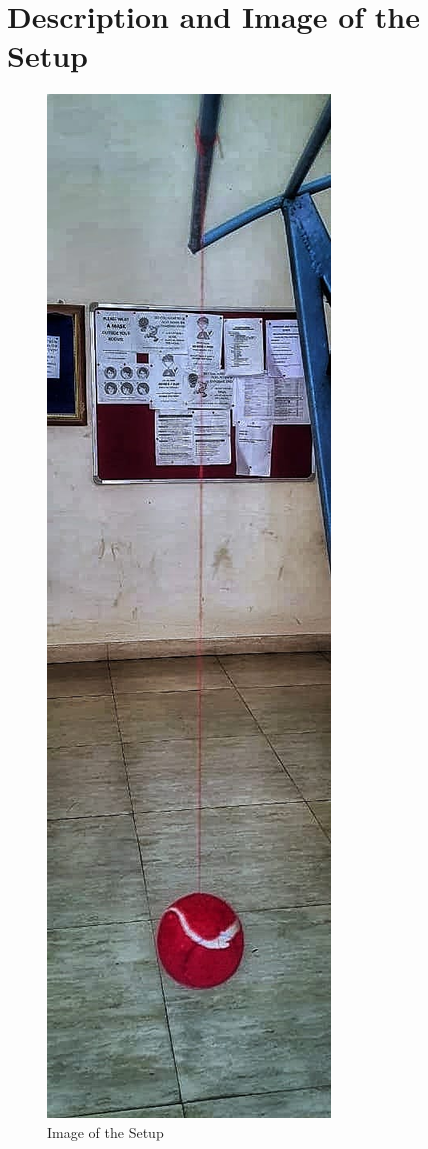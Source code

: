 \documentclass[12pt]{article}
\begin{document}
	\section{Description and Image of the Setup}
	\begin{figure}[H]
		\centering
		\includegraphics[scale=0.2]{Experiment}
		\caption{Image of the Setup}
	\end{figure}
\end{document}
